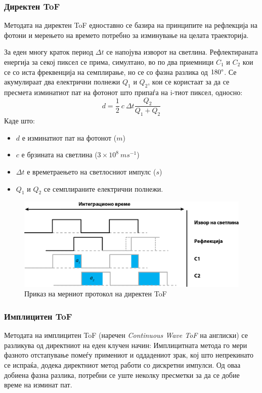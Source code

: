 \documentclass[12pt]{article}
\begin{document}
	\subsubsection{Директен ToF}
		Методата на директен ToF едноставно се базира на принципите на рефлекција на фотони и мерењето на времето потребно за изминување на целата траекторија.

		За еден многу краток период $ \Delta t $ се напојува изворот на светлина. Рефлектираната енергија за секој пиксел се прима, симултано, во по два приемници $C_1$ и $C_2$ кои се со иста фреквенција на семплирање, но се со фазна разлика од $180 \degree$. Се акумулираат два електрични полнежи $Q_1$ и  $Q_2$, кои се користаат за да се пресмета изминатиот пат на фотонот што припаѓа на i-тиот пиксел, односно:
		$$ d = \frac{1}{2} \ c\  \Delta t \frac{Q_2}{Q_1 + Q_2} $$
		Каде што:
		\begin{itemize}
			\item $d$ е изминатиот пат на фотонот ($m$)
			\item $c$ е брзината на светлина ($ 3 \times 10^8\ ms^{-1} $)
			\item $\Delta t$ е времетраењето на светлосниот импулс ($s$)
			\item $Q_1$ и $Q_2$ се семплираните електрични полнежи.
			\end{itemize}

		\begin{figure}[H]
			\includegraphics[width=0.75\linewidth]{./images/impulseToF.png}
			\centering
			\caption{Приказ на мерниот протокол на директен ToF}
			\label{fig:impulseToF.png}
			\end{figure}

	\subsubsection{Имплицитен ToF}
		Методата на имплицитен ToF (наречен \textit{Continuous Wave ToF} на англиски) се разликува од директниот на еден клучен начин: Имплицитната метода го мери фазното отстапување помеѓу примениот и оддадениот зрак, кој што непрекинато се испраќа, додека директниот метод работи со дискретни импулси. Од оваа добиена фазна разлика, потребни се уште неколку пресметки за да се добие време на изминат пат.
\end{document}

